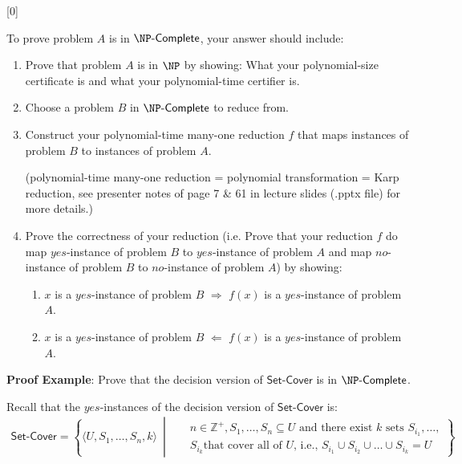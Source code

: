 [0]

To prove problem $A$ is in $\complete{\NP}$, your answer should include:
\begin{enumerate}

  \item Prove that problem $A$ is in $\NP$ by showing: What your {\color{red} polynomial-size} certificate is and what your {\color{red} polynomial-time} certifier is.

  \item Choose a problem $B$ in $\complete{\NP}$ to reduce from.
  
  \item Construct your {\color{red} polynomial-time many-one reduction} $f$ that maps instances of problem $B$ to instances of problem $A$. 
  
  (polynomial-time many-one reduction = polynomial transformation = Karp reduction, see presenter notes of page 7 \& 61 in lecture slides (.pptx file) for more details.) 

  \item Prove the correctness of your reduction (i.e. Prove that your reduction $f$ do map $yes$-instance of problem $B$ to $yes$-instance of problem $A$ and map $no$-instance of problem $B$ to $no$-instance of problem $A$) by showing:
  \begin{enumerate}
      \item $x$ is a $yes$-instance of problem $B$ $\Rightarrow$ $f(x)$ is a $yes$-instance of problem $A$.
      \item $x$ is a $yes$-instance of problem $B$ $\Leftarrow$ $f(x)$ is a $yes$-instance of problem $A$.
  \end{enumerate}
\end{enumerate}
{\textbf{Proof Example}: Prove that the decision version of $\mathsf{Set\text{-}Cover}$ is in $\complete{\NP}$.}

 Recall that the $yes$-instances of the decision version of $\mathsf{Set\text{-}Cover}$ is:
\begin{align*}
\mathsf{Set\text{-}Cover}= \left\{\langle{U, S_1, \ldots, S_n, k \rangle}~\middle|~~~
 \begin{aligned}
     &n \in \mathbb{Z}^+, S_1, \ldots, S_n \subseteq U \text{ and there exist $k$ sets } S_{i_1}, \ldots, \\& S_{i_k} 
     \text{that cover all of $U$, i.e., }
     S_{i_1} \cup S_{i_2} \cup \dots \cup S_{i_k} = U
 \end{aligned}
\right\}
\end{align*}


